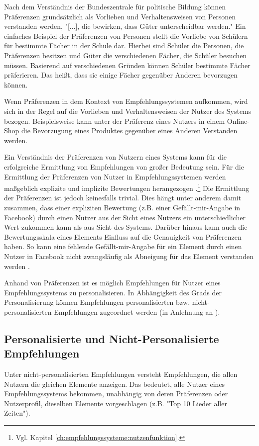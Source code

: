 Nach dem Verständnis der Bundeszentrale für politische Bildung können Präferenzen grundsätzlich als Vorlieben und Verhaltensweisen von Personen verstanden werden, "[...], die bewirken, dass Güter unterscheidbar werden."\cite{pollert:book}
Ein einfaches Beispiel der Präferenzen von Personen stellt die Vorliebe von Schülern für bestimmte Fächer in der Schule dar.
Hierbei sind Schüler die Personen, die Präferenzen besitzen und Güter die verschiedenen Fächer, die Schüler besuchen müssen.
Basierend auf verschiedenen Gründen können Schüler bestimmte Fächer präferieren.
Das heißt, dass sie einige Fächer gegenüber Anderen bevorzugen können.

Wenn Präferenzen in dem Kontext von Empfehlungssystemen aufkommen, wird sich in der Regel auf die Vorlieben und Verhaltensweisen der Nutzer des Systems bezogen.
Beispielsweise kann unter der Präferenz eines Nutzers in einem Online-Shop die Bevorzugung eines Produktes gegenüber eines Anderen Verstanden werden.

Ein Verständnis der Präferenzen von Nutzern eines Systems kann für die erfolgreiche Ermittlung von Empfehlungen von großer Bedeutung sein. %
Für die Ermittlung der Präferenzen von Nutzer in Empfehlungssystemen werden maßgeblich explizite und implizite Bewertungen herangezogen \cite[S. 1]{jawaheer:article}.\footnote{Vgl. Kapitel \ref{ch:empfehlungssysteme:nutzenfunktion}.}
Die Ermittlung der Präferenzen ist jedoch keinesfalls trivial.
Dies hängt unter anderem damit zusammen, dass einer expliziten Bewertung (z.B. einer Gefällt-mir-Angabe in Facebook) durch einen Nutzer aus der Sicht eines Nutzers ein unterschiedlicher Wert zukommen kann als aus Sicht des Systems.
Darüber hinaus kann auch die Bewertungsskala eines Elements Einfluss auf die Genauigkeit von Präferenzen haben.
So kann eine fehlende Gefällt-mir-Angabe für ein Element durch einen Nutzer in Facebook nicht zwangsläufig als Abneigung für das Element verstanden werden \cite[S. 11]{recommenderSystems:2016}.

Anhand von Präferenzen ist es möglich Empfehlungen für Nutzer eines Empfehlungssystems zu personalisieren.
In Abhängigkeit des Grads der Personalisierung können Empfehlungen personalisierten bzw. nicht-personalisierten Empfehlungen zugeordnet werden (in Anlehnung an \cite[S. 400]{unternährer:article}).

\subsection{Personalisierte und Nicht-Personalisierte Empfehlungen}
Unter nicht-personalisierten Empfehlungen versteht \textcite[S. 400]{unternährer:article} Empfehlungen, die allen Nutzern die gleichen Elemente anzeigen.
Das bedeutet, alle Nutzer eines Empfehlungssystems bekommen, unabhängig von deren Präferenzen oder Nutzerprofil, dieselben Elemente vorgeschlagen (z.B. "Top 10 Lieder aller Zeiten").

